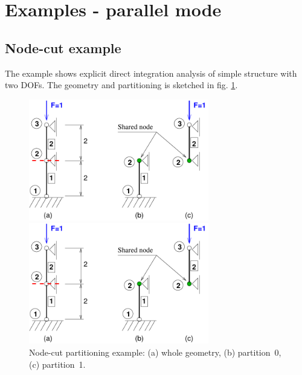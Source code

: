 \documentclass[a4paper]{article}
\begin{document}
\section{Examples - parallel mode}
\subsection{Node-cut example}
The example shows explicit direct integration analysis of
simple structure with two DOFs.
The geometry and partitioning is sketched in
fig. \ref{nodecut-ex01}.

\begin{figure}[htb]
\begin{htmlonly}
  \centerline{\includegraphics[width=0.7\textwidth]{poofem_ex01}}
\end{htmlonly}
\centerline{\includegraphics[width=0.7\textwidth]{poofem_ex01}}
\caption{Node-cut partitioning example: (a) whole geometry,
(b) partition~0, (c) partition~1.}
\label{nodecut-ex01}
\end{figure}
\end{document}
